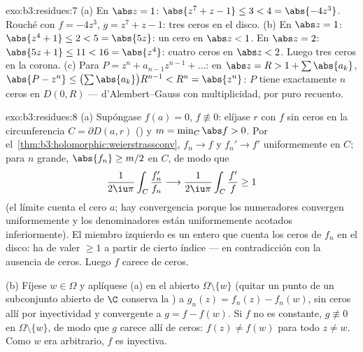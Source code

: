 \begin{solution}{exo:b3:residues:7}
(a) En $\abs z = 1$: $\abs{z^7 + z - 1} \leq 3 < 4 =
\abs{-4z^3}$. Rouché con $f = -4z^3$, $g = z^7 + z - 1$: tres ceros en
el disco. (b) En $\abs z = 1$: $\abs{z^4 + 1} \leq 2 < 5 = \abs{5z}$: un
cero en $\abs z < 1$. En $\abs z = 2$: $\abs{5z + 1} \leq
11 < 16 = \abs{z^4}$: cuatro ceros en $\abs z < 2$. Luego tres ceros en
la corona. (c) Para $P = z^n + a_{n-1}z^{n-1} + \dots$: en $\abs z = R >
1 + \sum\abs{a_k}$, $\abs{P - z^n} \leq
\bigl(\sum\abs{a_k}\bigr)R^{n-1} < R^n = \abs{z^n}$: $P$ tiene
exactamente $n$ ceros en $D(0, R)$ --- d'Alembert--Gauss con
multiplicidad, por puro recuento.
\end{solution}

\begin{solution}{exo:b3:residues:8}
(a) Supóngase $f(a) = 0$, $f \not\equiv 0$: elíjase $r$ con $f$ sin
ceros en la circunferencia $C = \partial D(a, r)$
() y
$m = \min_C\abs f > 0$. Por
el~\cref{thm:b3:holomorphic:weierstrassconv}, $f_n \to f$ y
$f_n' \to f'$ uniformemente en $C$; para $n$ grande, $\abs{f_n}
\geq m/2$ en $C$, de modo que
\[
\frac1{2\iu\pi}\int_C\frac{f_n'}{f_n}
\longrightarrow \frac1{2\iu\pi}\int_C\frac{f'}{f} \geq 1
\]
(el límite cuenta el cero $a$; hay convergencia porque los numeradores
convergen uniformemente y los denominadores están uniformemente acotados
inferiormente). El miembro izquierdo es un entero que cuenta los ceros
de $f_n$ en el disco: ha de valer $\geq 1$ a partir de cierto índice ---
en contradicción con la ausencia de ceros. Luego $f$ carece de ceros.

(b) Fíjese $w \in \Omega$ y aplíquese (a) en el
abierto
 $\Omega\setminus\{w\}$
(quitar un punto de un subconjunto abierto
 de $\C$ conserva la
) a $g_n(z) = f_n(z) -
f_n(w)$, sin ceros allí por inyectividad y convergente a $g = f
- f(w)$. Si $f$ no es constante, $g \not\equiv 0$ en
$\Omega\setminus\{w\}$, de modo que $g$ carece allí de ceros: $f(z) \neq
f(w)$ para todo $z \neq w$. Como $w$ era arbitrario, $f$ es inyectiva.
\end{solution}

